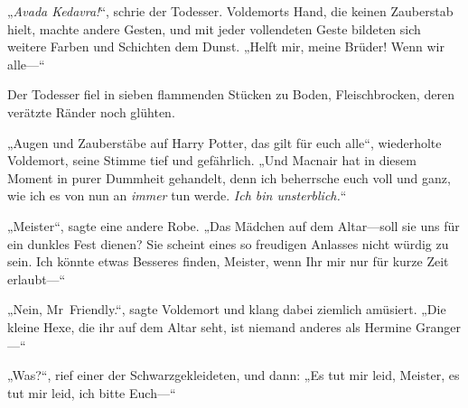 „\emph{Avada Kedavra!}“, schrie der Todesser.
Voldemorts Hand, die keinen Zauberstab hielt, machte andere Gesten, und mit jeder vollendeten Geste bildeten sich weitere Farben und Schichten dem Dunst.
„Helft mir, meine Brüder! Wenn wir alle—“

Der Todesser fiel in sieben flammenden Stücken zu Boden, Fleischbrocken, deren verätzte Ränder noch glühten.

„Augen und Zauberstäbe auf Harry Potter, das gilt für euch alle“, wiederholte Voldemort, seine Stimme tief und gefährlich. „Und Macnair hat in diesem Moment in purer Dummheit gehandelt, denn ich beherrsche euch voll und ganz, wie ich es von nun an \emph{immer} tun werde. \emph{Ich bin unsterblich.}“

„Meister“, sagte eine andere Robe. „Das Mädchen auf dem Altar—soll sie uns für ein dunkles Fest dienen? Sie scheint eines so freudigen Anlasses nicht würdig zu sein. Ich könnte etwas Besseres finden, Meister, wenn Ihr mir nur für kurze Zeit erlaubt—“

„Nein, Mr~Friendly.“, sagte Voldemort und klang dabei ziemlich amüsiert. „Die kleine Hexe, die ihr auf dem Altar seht, ist niemand anderes als Hermine Granger—“

„Was?“, rief einer der Schwarzgekleideten, und dann: „Es tut mir leid, Meister, es tut mir leid, ich bitte Euch—“

